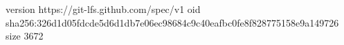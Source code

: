 version https://git-lfs.github.com/spec/v1
oid sha256:326d1d05fdcde5d6d1db7e06ec98684c9c40eafbc0fe8f828775158e9a149726
size 3672
